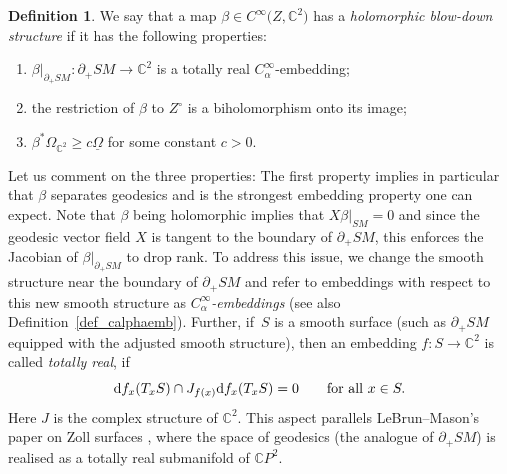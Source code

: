 \documentclass[10pt,a4paper]{amsart}
\numberwithin{equation}{section}
\theoremstyle{definition}
\newtheorem{Definition}[Theorem]{Definition}
\newcommand{\C}{\mathbb{C}} %
\newcommand{\1}{{\bf 1}}
\newcommand{\Om}{{\underline{\Omega}}}
\begin{document}
\begin{Definition}\label{def_bds}
We say that a map $\beta \in C^{\infty}\bigl(Z,\C^2\bigr)$ has a {\it holomorphic blow-down structure} if it has the following properties:
\begin{enumerate}[label=\rm(\roman*)]\itemsep=0pt
	\item\label{bds1} $\beta|_{\partial_{+}SM}\colon\partial_{+}SM\to \C^2$ is a totally real $C_\alpha^\infty$-embedding;
	
	\item\label{bds2} the restriction of $\beta$ to $Z^{\circ}$ is a biholomorphism onto its image;
	
	\item\label{bds3} $\beta^*\Omega_{\C^2}\ge c \Om$ for some constant $c>0$.
\end{enumerate}
\end{Definition}


Let us comment on the three properties: The first property implies in particular that $\beta$ separates geodesics and
is the strongest embedding property one can expect. Note that $\beta$ being holomorphic implies that $X\beta\vert_{SM}=0$ and since the geodesic vector field $X$ is tangent to the boundary of $\partial_+SM$, this enforces the Jacobian of $\beta|_{\partial_+SM}$ to drop rank. To address this issue, we change the smooth structure near the boundary of $\partial_+SM$ and refer to embeddings with respect to this new smooth structure as {\it $C_\alpha^\infty$-embeddings} (see also Definition~\ref{def_calphaemb}). Further, if~$S$ is a smooth surface (such as $\partial_+SM$ equipped with the adjusted smooth structure), then an embedding $f\colon S\rightarrow \C^2$ is called {\it totally real}, if
\[
	{\rm d}f_x(T_x S) \cap J_{f(x)} {\rm d}f_x(T_x S) = 0\qquad \text{for all} \  x\in S.
\]
Here $J$ is the complex structure of $\C^2$. This aspect parallels LeBrun--Mason's paper on Zoll surfaces \cite{LeMa02}, where the space of geodesics (the analogue of $\partial_+SM$) is realised as a totally real submanifold of $\C P^2$.
\end{document}
